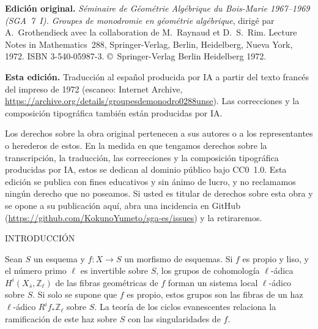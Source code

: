 \thispagestyle{empty}
\null\vfill
\begingroup\small
\noindent\textbf{Edición original.} \textit{Séminaire de Géométrie Algébrique du Bois-Marie 1967--1969 (SGA~7~I).
Groupes de monodromie en géométrie algébrique}, dirigé par A.~Grothendieck avec la collaboration de M.~Raynaud et
D.~S.~Rim. Lecture Notes in Mathematics~288, Springer-Verlag, Berlin, Heidelberg, Nueva York, 1972.
ISBN 3-540-05987-3. \copyright{}~Springer-Verlag Berlin Heidelberg 1972.\par
\medskip
\noindent\textbf{Esta edición.} Traducción al español producida por IA a partir del texto francés del impreso de
1972 (escaneo: Internet Archive, \url{https://archive.org/details/groupesdemonodro0288unse}). Las correcciones y la composición tipográfica también
están producidas por IA. \par
\medskip
\noindent Los derechos sobre la obra original pertenecen a sus autores o a los representantes o herederos de estos.
En la medida en que tengamos derechos sobre la transcripción, la traducción, las correcciones y la composición
tipográfica producidas por IA, estos se dedican al dominio público bajo CC0~1.0. Esta edición se publica con fines
educativos y sin ánimo de lucro, y no reclamamos ningún derecho que no poseamos. Si usted es titular de derechos sobre
esta obra y se opone a su publicación aquí, abra una incidencia en GitHub
(\url{https://github.com/KokunoYumeto/sga-es/issues}) y la retiraremos.\par
\endgroup
\clearpage


\begin{center}
INTRODUCCIÓN
\end{center}

Sean $S$ un esquema y $f:X\longrightarrow S$ un morfismo de esquemas. Si $f$ es
propio y liso, y el número primo $\ell$ es invertible sobre $S$, los grupos de
cohomología $\ell$-ádica $H^i(X_{\bar s},\mathbb Z_\ell)$ de las fibras geométricas de $f$ forman un sistema
local $\ell$-ádico sobre $S$. Si solo se supone que $f$ es propio, estos grupos son las fibras
de un haz $\ell$-ádico $R^i f_*\mathbb Z_\ell$ sobre $S$. La teoría de los ciclos evanescentes relaciona
la ramificación de este haz sobre $S$ con las singularidades de $f$.


